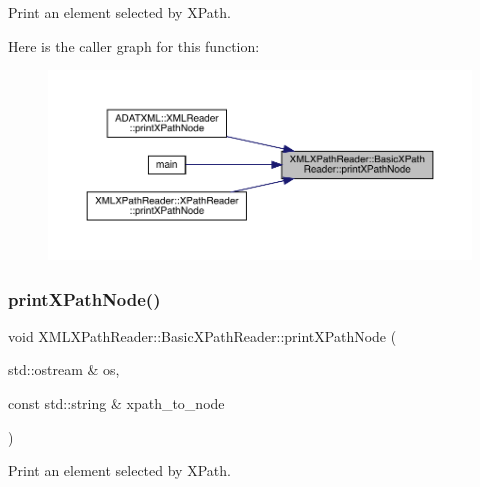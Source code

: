 Print an element selected by X\+Path. 

Here is the caller graph for this function\+:
\nopagebreak
\begin{figure}[H]
\begin{center}
\leavevmode
\includegraphics[width=350pt]{d6/dbf/classXMLXPathReader_1_1BasicXPathReader_afba694dbda7c2e1c26ca344085bfffb6_icgraph}
\end{center}
\end{figure}
\mbox{\label{classXMLXPathReader_1_1BasicXPathReader_afba694dbda7c2e1c26ca344085bfffb6}} 
\subsubsection{\texorpdfstring{printXPathNode()}{printXPathNode()}\hspace{0.1cm}{\footnotesize\ttfamily [2/3]}}
{\footnotesize\ttfamily void X\+M\+L\+X\+Path\+Reader\+::\+Basic\+X\+Path\+Reader\+::print\+X\+Path\+Node (\begin{DoxyParamCaption}\item[{std\+::ostream \&}]{os,  }\item[{const std\+::string \&}]{xpath\+\_\+to\+\_\+node }\end{DoxyParamCaption})}



Print an element selected by X\+Path. 

\mbox{\label{classXMLXPathReader_1_1BasicXPathReader_afba694dbda7c2e1c26ca344085bfffb6}} 
